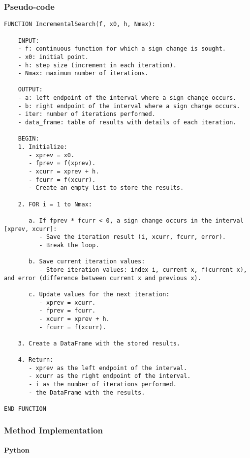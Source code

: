 \documentclass{article}
\begin{document}
        \subsubsection{Pseudo-code}
\begin{lstlisting}
FUNCTION IncrementalSearch(f, x0, h, Nmax):

    INPUT:
    - f: continuous function for which a sign change is sought.
    - x0: initial point.
    - h: step size (increment in each iteration).
    - Nmax: maximum number of iterations.

    OUTPUT:
    - a: left endpoint of the interval where a sign change occurs.
    - b: right endpoint of the interval where a sign change occurs.
    - iter: number of iterations performed.
    - data_frame: table of results with details of each iteration.

    BEGIN:
    1. Initialize:
       - xprev = x0.
       - fprev = f(xprev).
       - xcurr = xprev + h.
       - fcurr = f(xcurr).
       - Create an empty list to store the results.

    2. FOR i = 1 to Nmax:

       a. If fprev * fcurr < 0, a sign change occurs in the interval [xprev, xcurr]:
          - Save the iteration result (i, xcurr, fcurr, error).
          - Break the loop.

       b. Save current iteration values:
          - Store iteration values: index i, current x, f(current x), and error (difference between current x and previous x).

       c. Update values for the next iteration:
          - xprev = xcurr.
          - fprev = fcurr.
          - xcurr = xprev + h.
          - fcurr = f(xcurr).

    3. Create a DataFrame with the stored results.

    4. Return:
       - xprev as the left endpoint of the interval.
       - xcurr as the right endpoint of the interval.
       - i as the number of iterations performed.
       - the DataFrame with the results.

END FUNCTION
\end{lstlisting}

        \subsubsection{Method Implementation}

            \paragraph{Python}
\end{document}
